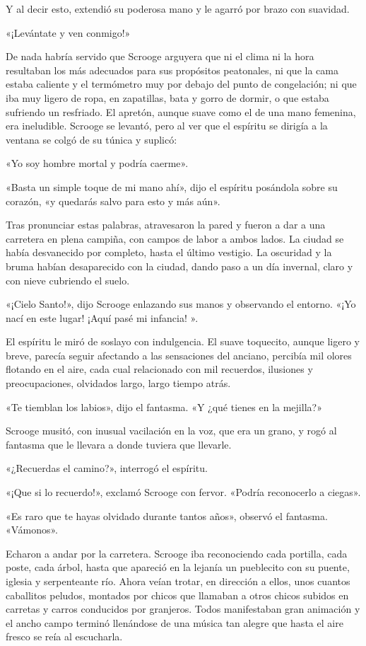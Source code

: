 \documentclass{novela}
\begin{document}
 Y al decir esto, extendió su poderosa mano y le agarró por brazo con suavidad.

 «¡Levántate y ven conmigo!»

 De nada habría servido que Scrooge arguyera que ni el clima ni la hora resultaban los más adecuados para sus propósitos peatonales, ni que la cama estaba caliente y el termómetro muy por debajo del punto de congelación; ni que iba muy ligero de ropa, en zapatillas, bata y gorro de dormir, o que estaba sufriendo un resfriado. El apretón, aunque suave como el de una mano femenina, era ineludible. Scrooge se levantó, pero al ver que el espíritu se dirigía a la ventana se colgó de su túnica y suplicó:

 «Yo soy hombre mortal y podría caerme».

 «Basta un simple toque de mi mano ahí», dijo el espíritu posándola sobre su corazón, «y quedarás salvo para esto y más aún».

 Tras pronunciar estas palabras, atravesaron la pared y fueron a dar a una carretera en plena campiña, con campos de labor a ambos lados. La ciudad se había desvanecido por completo, hasta el último vestigio. La oscuridad y la bruma habían desaparecido con la ciudad, dando paso a un día invernal, claro y con nieve cubriendo el suelo.

 «¡Cielo Santo!», dijo Scrooge enlazando sus manos y observando el entorno. «¡Yo nací en este lugar! ¡Aquí pasé mi infancia! ».

 El espíritu le miró de soslayo con indulgencia. El suave toquecito, aunque ligero y breve, parecía seguir afectando a las sensaciones del anciano, percibía mil olores flotando en el aire, cada cual relacionado con mil recuerdos, ilusiones y preocupaciones, olvidados largo, largo tiempo atrás.

 «Te tiemblan los labios», dijo el fantasma. «Y ¿qué tienes en la mejilla?»

 Scrooge musitó, con inusual vacilación en la voz, que era un grano, y rogó al fantasma que le llevara a donde tuviera que llevarle.

 «¿Recuerdas el camino?», interrogó el espíritu.

 «¡Que si lo recuerdo!», exclamó Scrooge con fervor. «Podría reconocerlo a ciegas».

 «Es raro que te hayas olvidado durante tantos años», observó el fantasma. «Vámonos».

 Echaron a andar por la carretera. Scrooge iba reconociendo cada portilla, cada poste, cada árbol, hasta que apareció en la lejanía un pueblecito con su puente, iglesia y serpenteante río. Ahora veían trotar, en dirección a ellos, unos cuantos caballitos peludos, montados por chicos que llamaban a otros chicos subidos en carretas y carros conducidos por granjeros. Todos manifestaban gran animación y el ancho campo terminó llenándose de una música tan alegre que hasta el aire fresco se reía al escucharla.
\end{document}
